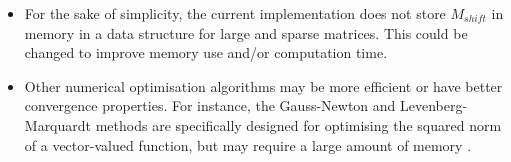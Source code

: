 \documentclass{article}
\begin{document}
\begin{itemize}
    \item For the sake of simplicity, the current implementation does not store $M_{shift}$ in memory in a data structure for large and sparse matrices. This could be changed to improve memory use and/or computation time.
    
    \item Other numerical optimisation algorithms may be more efficient or have better convergence properties. For instance, the Gauss-Newton and Levenberg-Marquardt methods are specifically designed for optimising the squared norm of a vector-valued function, but may require a large amount of memory \cite[Section 10.3]{Nocedal2006}.
    
\end{itemize}

\printbibliography
\end{document}
